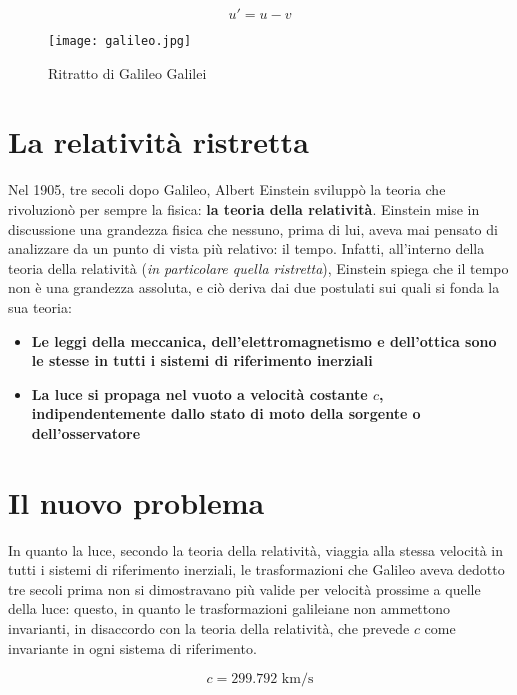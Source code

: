 \documentclass{article}
\begin{document}
\begin{equation}
    \label{velocità di Galileo}
    u' = u - v
\end{equation}

\begin{figure}[htbp] %
    \label{galileo}
    \centerline{\texttt{[image: galileo.jpg]}}
    \caption{Ritratto di Galileo Galilei}
\end{figure}

\section{La relatività ristretta}
Nel 1905, tre secoli dopo Galileo, Albert Einstein sviluppò la
teoria che rivoluzionò per sempre la fisica:
\textbf{la teoria della relatività}. Einstein mise in discussione
una grandezza fisica che nessuno, prima di lui, aveva mai pensato
di analizzare da un punto di vista più relativo: il tempo. Infatti,
all'interno della teoria della relatività (\textit{in particolare quella
ristretta}), Einstein spiega che il tempo non è una grandezza
assoluta, e ciò deriva dai due postulati sui quali si fonda
la sua teoria:

\begin{itemize}
    \item{\textbf{Le leggi della meccanica, dell'elettromagnetismo e
    dell'ottica sono le stesse in tutti i sistemi di riferimento inerziali}}
    \item{\textbf{La luce si propaga nel vuoto a velocità costante \(c\),
    indipendentemente dallo stato di moto della sorgente o dell'osservatore}}
\end{itemize}

\section{Il nuovo problema}
In quanto la luce, secondo la teoria della relatività, viaggia alla
stessa velocità in tutti i sistemi di riferimento inerziali,
le trasformazioni che Galileo aveva dedotto tre secoli prima non si
dimostravano più valide per velocità prossime a quelle della luce:
questo, in quanto le trasformazioni galileiane non ammettono invarianti,
in disaccordo con la teoria della relatività, che prevede \(c\) come
invariante in ogni sistema di riferimento.

\begin{equation}
    \label{velocità della luce}
    c = 299.792 \textrm{\ km/s}
\end{equation}
\end{document}
